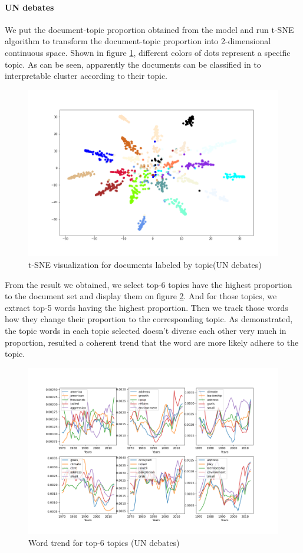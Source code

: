 \paragraph{UN debates}We put the document-topic proportion obtained from the model and run t-SNE algorithm to transform the document-topic proportion into 2-dimensional continuous space. Shown in figure \ref{fig:tsne1}, different colors of dots represent a specific topic. As can be seen, apparently the documents can be classified in to interpretable cluster according to their topic.\\
\begin{figure}[h]
\centering
\includegraphics[width=0.9\linewidth]{figures/1128/tsne1}
\caption{t-SNE visualization for documents labeled by topic(UN debates)}
\label{fig:tsne1}
\end{figure}
From the result we obtained, we select top-6 topics have the highest proportion to the document set and display them on figure \ref{fig:scatter}. And for those topics, we extract top-5 words having the highest proportion. Then we track those words how they change their proportion to the corresponding topic. As demonstrated, the topic words in each topic selected doesn't diverse each other very much in proportion, resulted a coherent trend that the word are more likely adhere to the topic.\\
\begin{figure}[h]
\centering
\includegraphics[width=0.9\linewidth]{figures/1220/scatter}
\caption{Word trend for top-6 topics (UN debates)}
\label{fig:scatter}
\end{figure}
